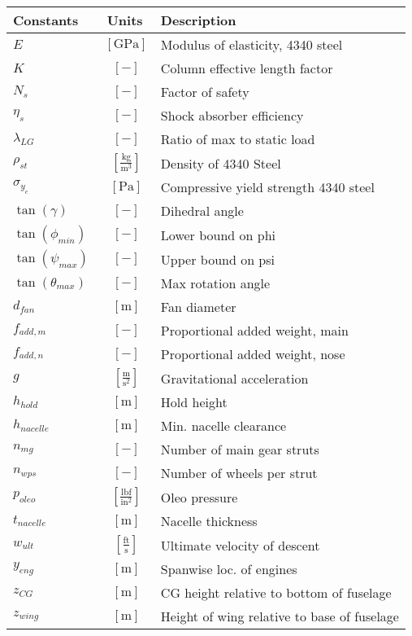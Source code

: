 \documentclass[12pt]{article}
\begin{document}
{\footnotesize
\begin{supertabular}{lcl}
\toprule
Constants & Units & Description \\ \midrule
$E$ & $~\mathrm{[GPa]}$ & Modulus of elasticity, 4340 steel \\
$K$ & $~[-]$ & Column effective length factor \\
$N_s$ & $~[-]$ & Factor of safety \\
$\eta_s$ & $~[-]$ & Shock absorber efficiency \\
$\lambda_{LG}$ & $~[-]$ & Ratio of max to static load \\
$\rho_{st}$ & $~\mathrm{[\tfrac{kg}{m^{3}}]}$ & Density of 4340 Steel \\
$\sigma_{y_c}$ & $~\mathrm{[Pa]}$ & Compressive yield strength 4340 steel \\
$\tan(\gamma)$ & $~[-]$ & Dihedral angle \\
$\tan(\phi_{min})$ & $~[-]$ & Lower bound on phi \\
$\tan(\psi_{max})$ & $~[-]$ & Upper bound on psi \\
$\tan(\theta_{max})$ & $~[-]$ & Max rotation angle \\
$d_{fan}$ & $~\mathrm{[m]}$ & Fan diameter \\
$f_{add,m}$ & $~[-]$ & Proportional added weight, main \\
$f_{add,n}$ & $~[-]$ & Proportional added weight, nose \\
$g$ & $~\mathrm{[\tfrac{m}{s^{2}}]}$ & Gravitational acceleration \\
$h_{hold}$ & $~\mathrm{[m]}$ & Hold height \\
$h_{nacelle}$ & $~\mathrm{[m]}$ & Min. nacelle clearance \\
$n_{mg}$ & $~[-]$ & Number of main gear struts \\
$n_{wps}$ & $~[-]$ & Number of wheels per strut \\
$p_{oleo}$ & $~\mathrm{[\tfrac{lbf}{in^{2}}]}$ & Oleo pressure \\
$t_{nacelle}$ & $~\mathrm{[m]}$ & Nacelle thickness \\
$w_{ult}$ & $~\mathrm{[\tfrac{ft}{s}]}$ & Ultimate velocity of descent \\
$y_{eng}$ & $~\mathrm{[m]}$ & Spanwise loc. of engines \\
$z_{CG}$ & $~\mathrm{[m]}$ & CG height relative to bottom of fuselage \\
$z_{wing}$ & $~\mathrm{[m]}$ & Height of wing relative to base of fuselage \\
\bottomrule
\end{supertabular}}

 
\end{document}
